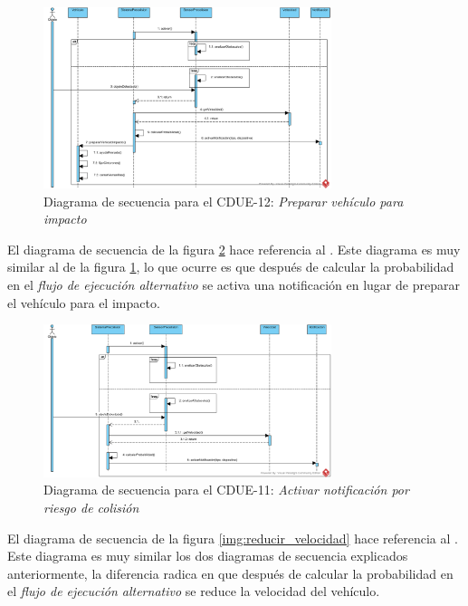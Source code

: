 \begin{figure}[h]
  \begin{center}
    \includegraphics[width=0.75\textwidth]{./img/diagramas_de_secuencia/CDUE-12.png}
  \end{center}
  \caption{Diagrama de secuencia para el CDUE-12: \textit{Preparar vehículo para impacto}}
  \label{img:prep_vehiculo_impacto}
\end{figure}

\par El diagrama de secuencia de la figura \ref{img:not_riesgo_colision} hace referencia al . Este diagrama es muy similar al de la figura \ref{img:prep_vehiculo_impacto}, lo que ocurre es que después de calcular la probabilidad en el \textit{flujo de ejecución alternativo} se activa una notificación en lugar de preparar el vehículo para el impacto.

\begin{figure}[h]
  \begin{center}
    \includegraphics[width=0.75\textwidth]{./img/diagramas_de_secuencia/CDUE-11.png}
  \end{center}
  \caption{Diagrama de secuencia para el CDUE-11: \textit{Activar notificación por riesgo de colisión}}
  \label{img:not_riesgo_colision}
\end{figure}

\par El diagrama de secuencia de la figura \ref{img:reducir_velocidad} hace referencia al . Este diagrama es muy similar los dos diagramas de secuencia explicados anteriormente, la diferencia radica en que después de calcular la probabilidad en el \textit{flujo de ejecución alternativo} se reduce la velocidad del vehículo.

